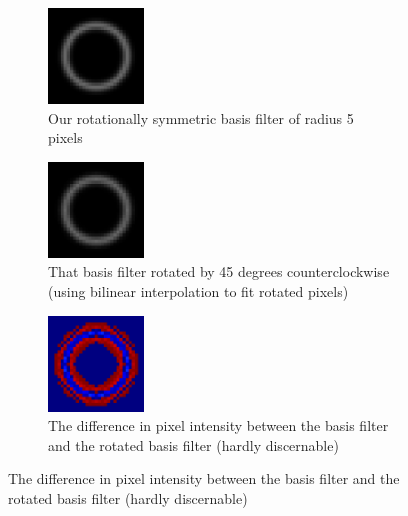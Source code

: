 \documentclass{article}
\begin{document}
\begin{figure}[h]
\centering
\begin{subfigure}[t]{.3\textwidth}
 \centering
 \includegraphics[width=1in]{basis}
 \caption{Our rotationally symmetric basis filter of radius 5 pixels}
\end{subfigure}
\begin{subfigure}[t]{.3\textwidth}
 \centering
 \includegraphics[width=1in]{rotbasis45}
 \caption{That basis filter rotated by 45 degrees counterclockwise (using bilinear interpolation to fit rotated pixels)}
\end{subfigure}
\begin{subfigure}[t]{.3\textwidth}
 \centering
 \includegraphics[width=1in]{diffbasisrot45}
 \caption{The difference in pixel intensity between the basis filter and the rotated basis filter (hardly discernable)}
\end{subfigure}
\end{figure}

{}

\end{document}

